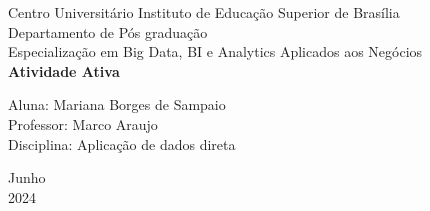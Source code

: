 \documentclass[a4paper, 12pt]{article}
\begin{document}

\begin{titlepage}
	\begin{center}
	

		\Huge{Centro Universitário Instituto de Educação Superior de Brasília}\\
		\large{Departamento de Pós graduação}\\ 
		\large{Especialização em Big Data, BI e Analytics Aplicados aos Negócios}\\ 
		\vspace{12pt}
        \vspace{70pt}
        \textbf{\LARGE{Atividade Ativa}}\\
		\vspace{3,5cm}
	\end{center}
	
	\begin{flushleft}
		\begin{tabbing}
			Aluna: Mariana Borges de Sampaio \\
			Professor: Marco Araujo\\
			Disciplina: Aplicação de dados direta \\
	\end{tabbing}
 \end{flushleft}
	\vspace{1cm}
	
	\begin{center}
		\vspace{\fill}
			 Junho\\
		 2024
			\end{center}
\end{titlepage}

\end{document}
